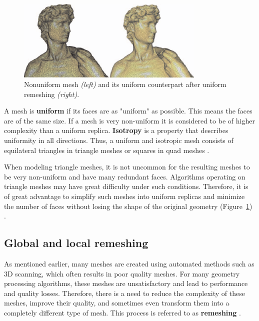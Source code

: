 \documentclass{ACGSeminar}
\begin{document}
\begin{figure}[htb!]
	\begin{centering}
		\includegraphics[width=9cm]{img/Uniform-Mesh.png}\par
	\end{centering}
	\caption{Nonuniform mesh \textit{(left)} and its uniform counterpart after uniform remeshing \textit{(right)}. \cite{alliez2008recent}}
	\label{fig:uniform-mesh}
\end{figure}

A mesh is \textbf{uniform} if its faces are as "uniform" as possible. This means the faces are of the same size. If a mesh is very non-uniform it is considered to be of higher complexity than a uniform replica. \textbf{Isotropy} is a property that describes uniformity in all directions. Thus, a uniform and isotropic mesh consists of equilateral triangles in triangle meshes or squares in quad meshes \cite{alliez2003isotropic,surazhsky2003isotropic}.

When modeling triangle meshes, it is not uncommon for the resulting meshes to be very non-uniform and have many redundant faces. Algorithms operating on triangle meshes may have great difficulty under such conditions. Therefore, it is of great advantage to simplify such meshes into uniform replicas and minimize the number of faces without losing the shape of the original geometry (Figure~\ref{fig:uniform-mesh}) \cite{jakob2015instant}.


\subsection{Global and local remeshing}\label{global-local-remeshing}
As mentioned earlier, many meshes are created using automated methods such as 3D scanning, which often results in poor quality meshes. For many geometry processing algorithms, these meshes are unsatisfactory and lead to performance and quality losses. Therefore, there is a need to reduce the complexity of these meshes, improve their quality, and sometimes even transform them into a completely different type of mesh. This process is referred to as \textbf{remeshing} \cite{alliez2008recent}.\bigskip
\end{document}
